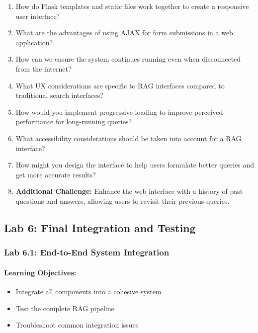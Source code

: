 \documentclass[
  screen,review,acmlarge]{acmart}
\providecommand{\tightlist}{%
  \setlength{\itemsep}{0pt}\setlength{\parskip}{0pt}}
\begin{document}
\begin{enumerate}
\def\labelenumi{\arabic{enumi}.}
\tightlist
\item
  How do Flask templates and static files work together to create a responsive user interface?
\item
  What are the advantages of using AJAX for form submissions in a web application?
\item
  How can we ensure the system continues running even when disconnected from the internet?
\item
  What UX considerations are specific to RAG interfaces compared to traditional search interfaces?
\item
  How would you implement progressive loading to improve perceived performance for long-running queries?
\item
  What accessibility considerations should be taken into account for a RAG interface?
\item
  How might you design the interface to help users formulate better queries and get more accurate results?
\item
  \textbf{Additional Challenge:} Enhance the web interface with a history of past questions and answers, allowing users to revisit their previous queries.
\end{enumerate}

\subsection{Lab 6: Final Integration and Testing}\label{lab-6-final-integration-and-testing}

\subsubsection{Lab 6.1: End-to-End System Integration}\label{lab-6.1-end-to-end-system-integration}

\paragraph{Learning Objectives:}\label{learning-objectives-8}

\begin{itemize}
\tightlist
\item
  Integrate all components into a cohesive system
\item
  Test the complete RAG pipeline
\item
  Troubleshoot common integration issues
\end{itemize}
\end{document}
